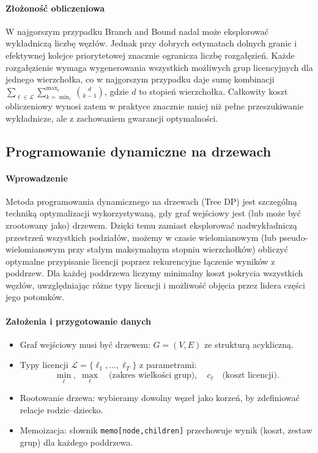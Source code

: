 \paragraph{Złożoność obliczeniowa}  
W najgorszym przypadku Branch and Bound nadal może eksplorować wykładniczą liczbę węzłów. Jednak przy dobrych estymatach dolnych granic i efektywnej kolejce priorytetowej znacznie ogranicza liczbę rozgałęzień. Każde rozgałęzienie wymaga wygenerowania wszystkich możliwych grup licencyjnych dla jednego wierzchołka, co w najgorszym przypadku daje sumę kombinacji $\sum_{\ell\in\mathcal{L}}\sum_{k=\min_\ell}^{\max_\ell}\binom{d}{k-1}$, gdzie $d$ to stopień wierzchołka. Całkowity koszt obliczeniowy wynosi zatem w praktyce znacznie mniej niż pełne przeszukiwanie wykładnicze, ale z zachowaniem gwarancji optymalności.  

\subsection{Programowanie dynamiczne na drzewach}

\paragraph{Wprowadzenie}  
Metoda programowania dynamicznego na drzewach (Tree DP) jest szczególną techniką optymalizacji wykorzystywaną, gdy graf wejściowy jest (lub może być zrootowany jako) drzewem. Dzięki temu zamiast eksplorować nadwykładniczą przestrzeń wszystkich podziałów, możemy w czasie wielomianowym (lub pseudo-wielomianowym przy stałym maksymalnym stopniu wierzchołków) obliczyć optymalne przypisanie licencji poprzez rekurencyjne łączenie wyników z poddrzew. Dla każdej poddrzewa liczymy minimalny koszt pokrycia wszystkich węzłów, uwzględniając różne typy licencji i możliwość objęcia przez lidera części jego potomków.

\paragraph{Założenia i przygotowanie danych}  
\begin{itemize}
  \item Graf wejściowy musi być drzewem: $G=(V,E)$ ze strukturą acykliczną.
  \item Typy licencji $\mathcal{L}=\{\ell_1,\dots,\ell_T\}$ z parametrami:
    \[
      \min_\ell,\;\max_\ell\quad\text{(zakres wielkości grup)},\quad
      c_\ell\quad\text{(koszt licencji)}.
    \]
  \item Rootowanie drzewa: wybieramy dowolny węzeł jako korzeń, by zdefiniować relacje rodzic–dziecko.
  \item Memoizacja: słownik \texttt{memo[node,children]} przechowuje wynik (koszt, zestaw grup) dla każdego poddrzewa.
\end{itemize}

